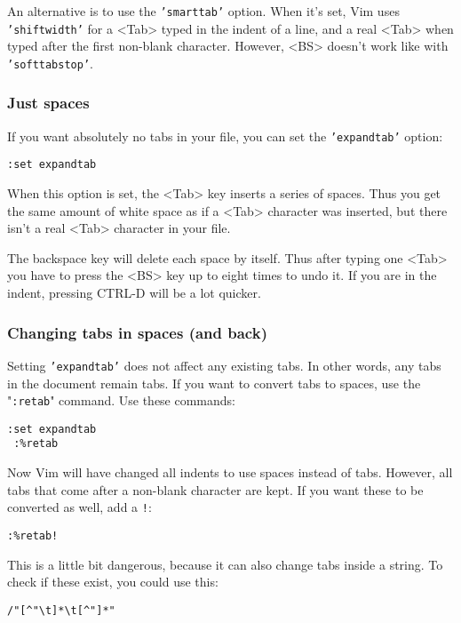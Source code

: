 {An alternative is to use the \texttt{'smarttab'} option.
When it's set, Vim uses \texttt{'shiftwidth'} for a <Tab> typed in the indent of a line, and a real <Tab> when typed after the first non-blank character.
However, <BS> doesn't work like with \texttt{'softtabstop'}.

\subsubsection{Just spaces}
If you want absolutely no tabs in your file, you can set the \texttt{'expandtab'} option:

\begin{Verbatim}[samepage=true]
 :set expandtab
\end{Verbatim}

When this option is set, the <Tab> key inserts a series of spaces.
Thus you get the same amount of white space as if a <Tab> character was inserted, but there isn't a real <Tab> character in your file.

The backspace key will delete each space by itself.
Thus after typing one <Tab> you have to press the <BS> key up to eight times to undo it.
If you are in the indent, pressing CTRL-D will be a lot quicker.

\subsubsection{Changing tabs in spaces (and back)}
Setting \texttt{'expandtab'} does not affect any existing tabs.
In other words, any tabs in the document remain tabs.
If you want to convert tabs to spaces, use the "\texttt{:retab}" command.
Use these commands:

\begin{Verbatim}[samepage=true]
 :set expandtab
 :%retab
\end{Verbatim}

Now Vim will have changed all indents to use spaces instead of tabs.
However, all tabs that come after a non-blank character are kept.
If you want these to be converted as well, add a \texttt{!}:

\begin{Verbatim}[samepage=true]
 :%retab!
\end{Verbatim}

This is a little bit dangerous, because it can also change tabs inside a string.
To check if these exist, you could use this:

\begin{Verbatim}[samepage=true]
 /"[^"\t]*\t[^"]*"
\end{Verbatim}

}
